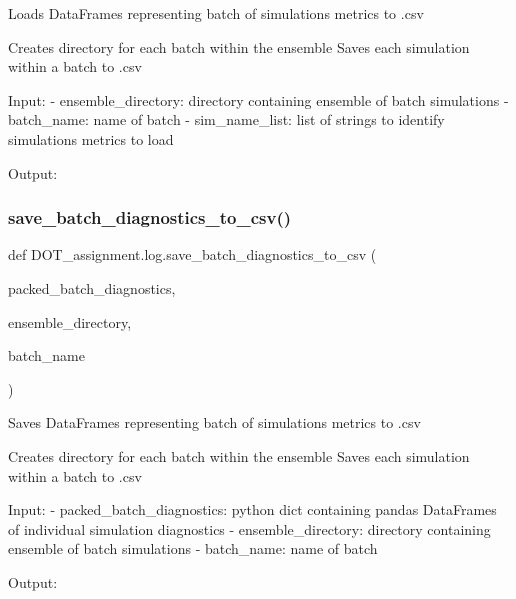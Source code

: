 \begin{DoxyVerb}Loads DataFrames representing batch of simulations metrics to .csv

Creates directory for each batch within the ensemble
Saves each simulation within a batch to .csv

Input:
- ensemble_directory:           directory containing ensemble of batch simulations
- batch_name:                   name of batch
- sim_name_list:                list of strings to identify simulations metrics to load

Output:\end{DoxyVerb}
 \mbox{\label{namespace_d_o_t__assignment_1_1log_a5acdb4dd21c8075f05ff8c11f000e3c5}} 
\subsubsection{\texorpdfstring{save\_batch\_diagnostics\_to\_csv()}{save\_batch\_diagnostics\_to\_csv()}}
{\footnotesize\ttfamily def D\+O\+T\+\_\+assignment.\+log.\+save\+\_\+batch\+\_\+diagnostics\+\_\+to\+\_\+csv (\begin{DoxyParamCaption}\item[{}]{packed\+\_\+batch\+\_\+diagnostics,  }\item[{}]{ensemble\+\_\+directory,  }\item[{}]{batch\+\_\+name }\end{DoxyParamCaption})}

\begin{DoxyVerb}Saves DataFrames representing batch of simulations metrics to .csv

Creates directory for each batch within the ensemble
Saves each simulation within a batch to .csv

Input:
- packed_batch_diagnostics:     python dict containing pandas DataFrames of individual simulation diagnostics
- ensemble_directory:           directory containing ensemble of batch simulations
- batch_name:                   name of batch

Output:\end{DoxyVerb}
 \mbox{\label{namespace_d_o_t__assignment_1_1log_a0db41021d90343a12b794eb06ccf6bc2}} 
